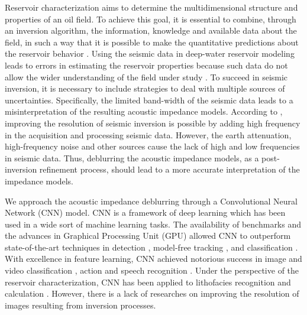 \documentclass[conference]{IEEEtran}
\begin{document}
Reservoir characterization aims to determine the multidimensional
structure and properties of an oil field. To achieve this goal, it is essential to combine, through an
inversion algorithm, the information, knowledge and available data about the field,
in such a way that it is possible to make the
quantitative predictions about the reservoir behavior \cite{buiting}.
Using the seismic data in deep-water reservoir modeling leads to errors in estimating
the reservoir properties because such data do not allow the wider understanding of the field
under study \cite{Sergio2016}.
To succeed in seismic inversion, it is necessary to include strategies to deal with multiple
sources of uncertainties. Specifically, the limited band-width of the seismic data leads to
a misinterpretation of the resulting acoustic impedance models.
According to \cite{xiaoiu}, improving the resolution of seismic inversion is
possible by adding high frequency in the acquisition and processing seismic data.
However, the earth attenuation, high-frequency noise and other sources cause
the lack of high and low frequencies in seismic data. 
Thus, deblurring the acoustic impedance models, as a post-inversion refinement process, should lead to a more accurate
interpretation of the impedance models.

We approach the acoustic impedance deblurring through
a Convolutional Neural Network (CNN) model. CNN is a framework of deep learning which has been
used in a wide sort of machine learning tasks. The availability of benchmarks
\cite{Russakovsky} and the advances in Graphical Processing Unit (GPU) \cite{Buduma15}
allowed CNN to outperform state-of-the-art techniques in detection \cite{Girshick2015,Bell2015}, model-free
tracking \cite{Nam}, and classification \cite{He2016}. With excellence in feature learning,
CNN achieved notorious success in image and video classification \cite{Krizhevsky2012, AbdelHamid2014}, action  and speech recognition \cite{Farfade2015, S_Ji2013}.
Under the perspective of the reservoir characterization, CNN has been applied to lithofacies recognition
\cite{Qian} and calculation \cite{Liu2017}. However, there is a lack of researches on improving the resolution of
images resulting from inversion processes.
\end{document}
